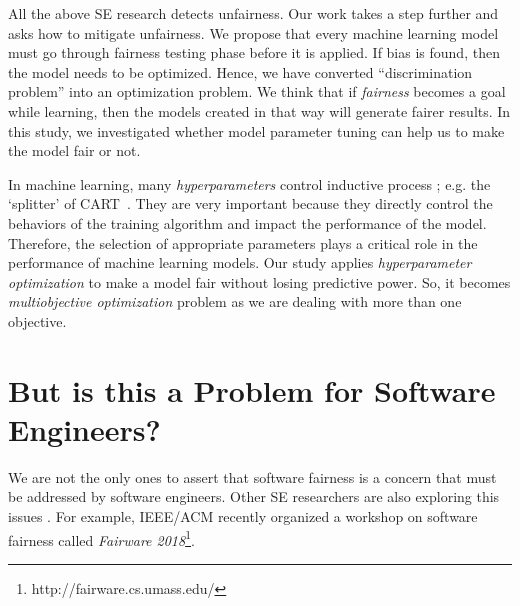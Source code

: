 \documentclass[10pt,conference,review]{IEEEtran}
\begin{document}
All the above SE research detects unfairness. Our work takes a step further and asks how to mitigate
unfairness. We propose that every machine learning model must go through fairness testing phase before it is applied. If bias is found, then the model needs to be optimized. Hence, we have converted ``discrimination problem'' into an optimization problem. We think that if \textit{fairness} becomes a goal while learning, then the  models created in that way will generate fairer results. In this study, we investigated whether model parameter tuning can help us to make the model fair or not. 
 
 In machine learning, many  {\em hyperparameters} control   inductive process ; e.g. the   `splitter' of CART~\cite{breiman2017classification}.  They are very important because they directly control the behaviors of the training algorithm and impact the performance of the model. Therefore, the selection of appropriate parameters plays a critical role in the performance of machine learning models. Our study applies \textit{hyperparameter optimization} to make a model fair without losing predictive power. So, it becomes \textit{multiobjective optimization} problem as we are dealing with more than one objective. 
 

\section{But is this a Problem for Software Engineers?} 
We are not the only ones to assert that software fairness is a concern that must be addressed 
by software engineers. Other SE researchers are also exploring this issues \cite{Angell:2018:TAT:3236024.3264590,Brun:2018:SF:3236024.3264838,Aydemir:2018:RES:3194770.3194778}. For example,   IEEE/ACM 
recently organized a workshop on software fairness called \textit{Fairware 2018}\footnote{http://fairware.cs.umass.edu/}.
\end{document}
